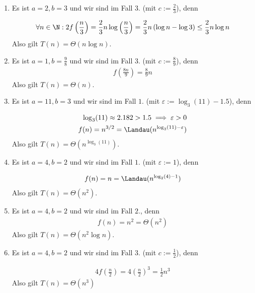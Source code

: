 \begin{solution}
\phantom{}

\begin{enumerate}[label = \alph*)]
  \item Es ist $a = 2, b = 3$ und wir sind im Fall $3.$ (mit $c := \frac{2}{3}$), denn

    \begin{align*}
      \forall n \in \N: 2f\left(\frac{n}{3}\right)
      =
      \frac{2}{3}n \log\left(\frac{n}{3}\right)
      =
      \frac{2}{3}n \left( \log n - \log 3\right)
      \leq
      \frac{2}{3} n\log n
    \end{align*}
  Also gilt $T(n) = \Theta(n\log n)$.

  \item Es ist $a = 1, b = \frac{9}{8}$ und wir sind im Fall $3.$ (mit $c := \frac{8}{9}$), denn
    \begin{align*}
      f\left(\frac{8n}{9}\right)
      =
      \frac{8}{9}n
    \end{align*}
  Also gilt $T(n) = \Theta(n)$.

  \item Es ist $a = 11, b = 3$ und wir sind im Fall $1.$ (mit $\varepsilon := \log_3(11)-1.5$), denn

    \begin{align*}
      \log_3(11) \approx 2.182 > 1.5 \implies \varepsilon > 0 \\
      f(n)
      = n^{3/2} =
      \Landau(n^{\log_3(11)-\varepsilon})
    \end{align*}
  Also gilt $T(n) = \Theta(n^{\log_3(11)})$.

  \item Es ist $a = 4, b = 2$ und wir sind im Fall $1.$ (mit $\varepsilon := 1$), denn

    \begin{align*}
      f(n)
      = n =
      \Landau(n^{\log_2(4)-1})
    \end{align*}
  Also gilt $T(n) = \Theta(n^2)$.

  \item Es ist $a = 4, b = 2$ und wir sind im Fall $2.$, denn
    \begin{align*}
      f(n) = n^2 = \Theta(n^2)
    \end{align*}
  Also gilt $T(n) = \Theta(n^2 \log n)$.

  \item Es ist $a = 4, b = 2$ und wir sind im Fall $3.$ (mit $c := \frac{1}{2}$), denn

    \begin{align*}
      4f\left(\frac{n}{2}\right)
      =
      4 \left(\frac{n}{2}\right)^3
      =
      \frac{1}{2} n^3
    \end{align*}
  Also gilt $T(n) = \Theta(n^3)$
\end{enumerate}

\end{solution}

